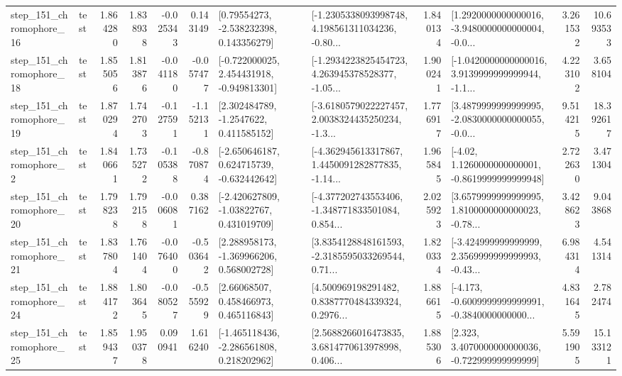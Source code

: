 \begin{tabular}{llrrrrllrlrr}
  step\_151\_chromophore\_16 &      test &      1.864280 &    1.838938 &     -0.025343 &  0.143149 &     [0.79554273, -2.538232398, 0.143356279] &  [-1.2305338093998748, 4.198561311034236, -0.80... &       1.840134 &  [1.2920000000000016, -3.9480000000000004, -0.0... &            3.261532 &         10.693533 \\
  step\_151\_chromophore\_18 &      test &      1.855056 &    1.813876 &     -0.041180 & -0.057477 &   [-0.722000025, 2.454431918, -0.949813301] &  [-1.2934223825454723, 4.263945378528377, -1.05... &       1.900241 &  [-1.0420000000000016, 3.9139999999999944, -1.1... &            4.223102 &          3.658104 \\
  step\_151\_chromophore\_19 &      test &      1.870294 &    1.742703 &     -0.127591 & -1.152131 &      [2.302484789, -1.2547622, 0.411585152] &  [-3.6180579022227457, 2.0038324435250234, -1.3... &       1.776917 &  [3.4879999999999995, -2.0830000000000055, -0.0... &            9.514215 &         18.392617 \\
   step\_151\_chromophore\_2 &      test &      1.840661 &    1.735272 &     -0.105388 & -0.870874 &   [-2.650646187, 0.624715739, -0.632442642] &  [-4.362945613317867, 1.4450091282877835, -1.14... &       1.965845 &   [-4.02, 1.1260000000000001, -0.8619999999999948] &            2.722630 &          3.471304 \\
  step\_151\_chromophore\_20 &      test &      1.798238 &    1.792158 &     -0.006081 &  0.387162 &    [-2.420627809, -1.03822767, 0.431019709] &  [-4.377202743553406, -1.348771833501084, 0.854... &       2.025923 &  [3.6579999999999995, 1.8100000000000023, -0.78... &            3.428623 &          9.043868 \\
  step\_151\_chromophore\_21 &      test &      1.837804 &    1.761404 &     -0.076400 & -0.503642 &    [2.288958173, -1.369966206, 0.568002728] &  [3.8354128848161593, -2.3185595033269544, 0.71... &       1.820334 &  [-3.424999999999999, 2.3569999999999993, -0.43... &            6.984314 &          4.541314 \\
  step\_151\_chromophore\_24 &      test &      1.884172 &    1.803645 &     -0.080527 & -0.555929 &      [2.66068507, 0.458466973, 0.465116843] &  [4.500969198291482, 0.8387770484339324, 0.2976... &       1.886615 &  [-4.173, -0.6009999999999991, -0.3840000000000... &            4.831645 &          2.782474 \\
  step\_151\_chromophore\_25 &      test &      1.859437 &    1.950378 &      0.090941 &  1.616240 &   [-1.465118436, -2.286561808, 0.218202962] &  [2.5688266016473835, 3.6814770613978998, 0.406... &       1.885306 &    [2.323, 3.4070000000000036, -0.722999999999999] &            5.591905 &         15.133121 \\

\end{tabular}
